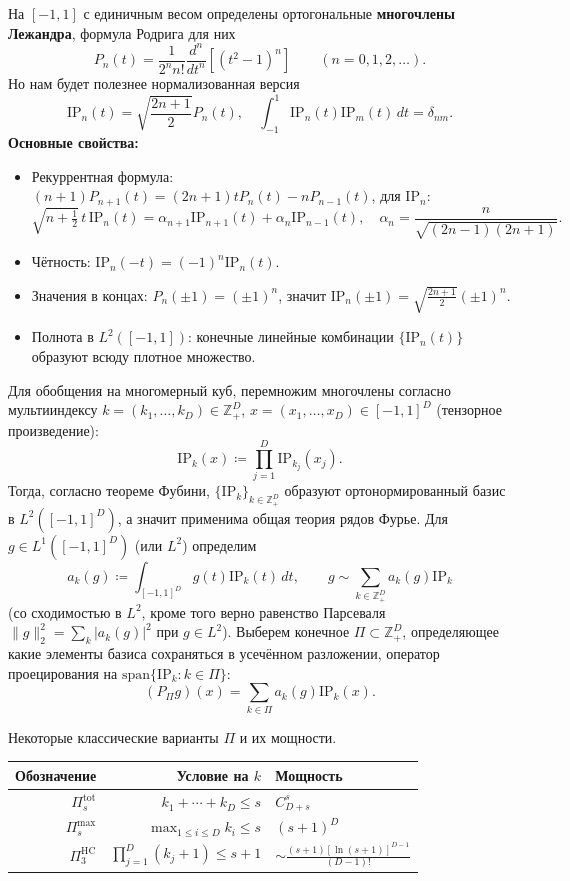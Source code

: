 \documentclass[../NDCNNAI_main.tex]{subfiles}
\begin{document}
На $[-1, 1]$ с единичным весом определены ортогональные \textbf{многочлены Лежандра}, формула Родрига для них
$$P_n(t) = \frac{1}{2^n n!} \frac{d^n}{dt^n} \left[(t^2 - 1)^n\right] \qquad (n = 0,1,2,\dots).$$
Но нам будет полезнее нормализованная версия
$$\mathrm{IP}_n(t) = \sqrt{\frac{2n+1}{2}} P_n(t), \quad \int_{-1}^1 \mathrm{IP}_n(t) \mathrm{IP}_m(t) \, dt = \delta_{nm}.$$
\textbf{Основные свойства:}
\begin{itemize}
  \item Рекуррентная формула: $(n+1)P_{n+1}(t) = (2n+1)t P_n(t) - n P_{n-1}(t)$, для $\mathrm{IP}_n$:
  $$\sqrt{n + \tfrac{1}{2}} \, t \, \mathrm{IP}_n(t) = \alpha_{n+1} \mathrm{IP}_{n+1}(t) + \alpha_n \mathrm{IP}_{n-1}(t), \quad \alpha_n = \frac{n}{\sqrt{(2n-1)(2n+1)}}.$$  
  \item Чётность: $\mathrm{IP}_n(-t) = (-1)^n \mathrm{IP}_n(t)$.
  \item Значения в концах: $P_n(\pm 1) = (\pm 1)^n$, значит $\mathrm{IP}_n(\pm 1) = \sqrt{\frac{2n+1}{2}} (\pm 1)^n$.
  \item Полнота в $L^2([-1,1])$: конечные линейные комбинации $\{\mathrm{IP}_n(t)\}$ образуют всюду плотное множество.
\end{itemize}
Для обобщения на многомерный куб, перемножим многочлены согласно мультииндексу $k = (k_1,\dots,k_D) \in \mathbb{Z}_+^D$, $x = (x_1,\dots,x_D) \in [-1,1]^D$ (тензорное произведение):
$$\mathrm{IP}_k(x) \coloneq \prod_{j=1}^D \mathrm{IP}_{k_j}(x_j).$$
Тогда, согласно теореме Фубини, $\{\mathrm{IP}_k\}_{k \in \mathbb{Z}_+^D}$ образуют ортонормированный базис в $L^2([-1,1]^D)$, а значит применима общая теория рядов Фурье.
Для $g \in L^1([-1,1]^D)$ (или $L^2$) определим
$$a_k(g) \coloneq \int_{[-1,1]^D} g(t) \mathrm{IP}_k(t) \, dt, \qquad g \sim \sum_{k \in \mathbb{Z}_+^D} a_k(g) \mathrm{IP}_k$$
(со сходимостью в $L^2$, кроме того верно равенство Парсеваля $\|g\|_2^2 = \sum_k |a_k(g)|^2$ при $g \in L^2$).
Выберем конечное $\Pi \subset \mathbb{Z}_+^D$, определяющее какие элементы базиса сохраняться в усечённом разложении, оператор проецирования на $\mathrm{span}\{\mathrm{IP}_k : k \in \Pi\}$:
$$(P_\Pi g)(x) = \sum_{k \in \Pi} a_k(g) \mathrm{IP}_k(x).$$
\begin{example}
  Некоторые классические варианты $\Pi$ и их мощности.
  \begin{table}[!h]
    \centering
    \begin{tabular}{|r|r|l|}
      \hline
      Обозначение & Условие на $k$ & Мощность\\
      \hline
      $\Pi_s^{\text{tot}}$ & $k_1 + \cdots + k_D \le s$ & $C_{D + s}^s$\\
      $\Pi_s^{\max}$ & $\max_{1 \le i \le D}{k_i} \le s$ & $(s + 1)^D$\\
      $\Pi_3^{\text{HC}}$ & $\prod_{j = 1}^{D}(k_j + 1) \le s + 1$ & $\sim\frac{(s+1)[\ln(s+1)]^{D-1}}{(D-1)!}$\\
      \hline
    \end{tabular}
  \end{table}
\end{example}
\end{document}
